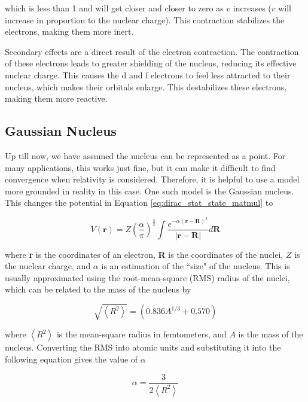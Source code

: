 \documentclass[12pt]{report}
\begin{document}
which is less than 1 and will get closer and closer to zero as $v$ increases ($v$ will increase in proportion to the nuclear charge). This contraction stabilizes the electrons, making them more inert. 

Secondary effects are a direct result of the electron contraction. The contraction of these electrons leads to greater shielding of the nucleus, reducing its effective nuclear charge. This causes the d and f electrons to feel less attracted to their nucleus, which makes their orbitals enlarge. This destabilizes these electrons, making them more reactive\cite{Piela}.

\subsection{Gaussian Nucleus}
Up till now, we have assumed the nucleus can be represented as a point. For many applications, this works just fine, but it can make it difficult to find convergence when relativity is considered. Therefore, it is helpful to use a model more grounded in reality in this case. One such model is the Gaussian nucleus. This changes the potential in Equation \ref{eq:dirac_stat_state_matmul} to

\begin{equation}
\label{eq:gauss_nuc_pot}
V(\textbf{r}) = Z\left(\frac{\alpha}{\pi}\right)^{\frac{3}{2}}\int\frac{e^{-\alpha(\textbf{r} - \textbf{R})^{2}}}{|\textbf{r} - \textbf{R}|}d\textbf{R}
\end{equation}

where \textbf{r} is the coordinates of an electron, \textbf{R} is the coordinates of the nuclei, $Z$ is the nuclear charge, and $\alpha$ is an estimation of the ``size" of the nucleus. This is usually approximated using the root-mean-square (RMS) radius of the nuclei\cite{VISSCHER1997207}, which can be related to the mass of the nucleus by\cite{1985ADNDT..33..405J}

\begin{equation}
\label{eq:gauss_nuc_RMS}
\sqrt{\left<R^{2}\right>} = \left(0.836A^{1/3} + 0.570\right)
\end{equation}

where $\left<R^{2}\right>$ is the mean-square radius in femtometers, and $A$ is the mass of the nucleus. Converting the RMS into atomic units and substituting it into the following equation gives the value of $\alpha$\cite{VISSCHER1997207}

\begin{equation}
\label{eq:gauss_nuc_alpha}
\alpha = \frac{3}{2\left<R^{2}\right>}
\end{equation}
\end{document}
